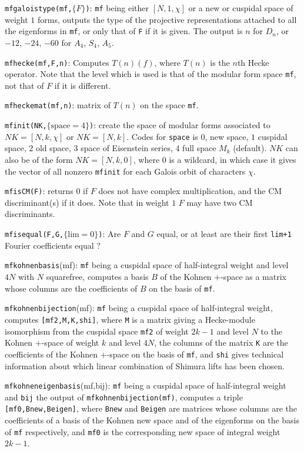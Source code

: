 \documentclass[11pt]{article}
\def\kbd#1{{\tt #1}}
\begin{document}
\f\kbd{mfgaloistype(mf,$\{F\}$)}: \kbd{mf} being either $[N,1,\chi]$ or
a new or cuspidal space of weight $1$ forms, outputs the type of the projective
representations attached to all the eigenforms in \kbd{mf}, or only that of
\kbd{F} if it is given. The output is $n$ for $D_n$, or $-12$, $-24$, $-60$ for
$A_4$, $S_4$, $A_5$.

\f\kbd{mfhecke(mf,F,n)}: Computes $T(n)(f)$, where $T(n)$ is the $n$th Hecke
operator. Note that the level which is used is that of the modular form space
\kbd{mf}, not that of $F$ if it is different.

\f\kbd{mfheckemat(mf,n)}: matrix of $T(n)$ on the space \kbd{mf}.

\f\kbd{mfinit(NK,$\{\text{space}=4\}$)}: create the space of modular forms
associated to $NK=[N,k,\chi]$ or $NK=[N,k]$. Codes for \kbd{space} is $0$,
new space, $1$ cuspidal space, $2$ old space, $3$ space of Eisenstein series,
$4$ full space $M_k$ (default). $NK$ can also be of the form $NK=[N,k,0]$,
where $0$ is a wildcard, in which case it gives the vector of all nonzero
\kbd{mfinit} for each Galois orbit of characters $\chi$.

\f\kbd{mfisCM(F)}: returns $0$ if $F$ does not have complex multiplication,
and the CM discriminant(s) if it does. Note that in weight $1$ $F$ may have
two CM discriminants.

\f\kbd{mfisequal(F,G,$\{\text{lim}=0\}$)}: Are $F$ and $G$ equal, or at least
are their first \kbd{lim+1} Fourier coefficients equal ?

\f\kbd{mfkohnenbasis}(mf): \kbd{mf} being a cuspidal space of half-integral
weight and level $4N$ with $N$ squarefree, computes a basis $B$ of the Kohnen
$+$-space as a matrix whose columns are the coefficients of $B$ on the basis
of \kbd{mf}.

\f\kbd{mfkohnenbijection}(mf): \kbd{mf} being a cuspidal space of
half-integral weight, computes \kbd{[mf2,M,K,shi]}, where \kbd{M} is a matrix
giving a Hecke-module isomorphism from the cuspidal space \kbd{mf2} of weight
$2k-1$ and level $N$ to the Kohnen $+$-space of weight $k$ and level $4N$,
the columns of the matrix \kbd{K} are the coefficients of the Kohnen $+$-space
on the basis of \kbd{mf}, and \kbd{shi} gives technical information about
which linear combination of Shimura lifts has been chosen.

\f\kbd{mfkohneneigenbasis}(mf,bij): \kbd{mf} being a cuspidal space of
half-integral weight and \kbd{bij} the output of \kbd{mfkohnenbijection(mf)},
computes a triple \kbd{[mf0,Bnew,Beigen]}, where \kbd{Bnew} and \kbd{Beigen}
are matrices whose columns are the coefficients of a basis of the Kohnen
new space and of the eigenforms on the basis of \kbd{mf} respectively, and
\kbd{mf0} is the corresponding new space of integral weight $2k-1$.
\end{document}
